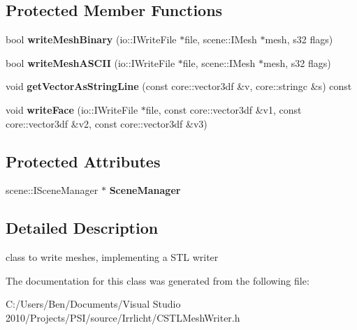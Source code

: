 \subsection*{Protected Member Functions}
\begin{DoxyCompactItemize}
\item 
\hypertarget{classirr_1_1scene_1_1_c_s_t_l_mesh_writer_a7c342c2b76a3b5ddefe7aeeedb5c644d}{bool {\bfseries write\-Mesh\-Binary} (io\-::\-I\-Write\-File $\ast$file, scene\-::\-I\-Mesh $\ast$mesh, s32 flags)}\label{classirr_1_1scene_1_1_c_s_t_l_mesh_writer_a7c342c2b76a3b5ddefe7aeeedb5c644d}

\item 
\hypertarget{classirr_1_1scene_1_1_c_s_t_l_mesh_writer_a773fa656db06bf3668f823cabb79c4df}{bool {\bfseries write\-Mesh\-A\-S\-C\-I\-I} (io\-::\-I\-Write\-File $\ast$file, scene\-::\-I\-Mesh $\ast$mesh, s32 flags)}\label{classirr_1_1scene_1_1_c_s_t_l_mesh_writer_a773fa656db06bf3668f823cabb79c4df}

\item 
\hypertarget{classirr_1_1scene_1_1_c_s_t_l_mesh_writer_a4d89343c498113f9b45ca1c4e176fd55}{void {\bfseries get\-Vector\-As\-String\-Line} (const core\-::vector3df \&v, core\-::stringc \&s) const }\label{classirr_1_1scene_1_1_c_s_t_l_mesh_writer_a4d89343c498113f9b45ca1c4e176fd55}

\item 
\hypertarget{classirr_1_1scene_1_1_c_s_t_l_mesh_writer_a5cd2114128f78516e3d786822dff75cc}{void {\bfseries write\-Face} (io\-::\-I\-Write\-File $\ast$file, const core\-::vector3df \&v1, const core\-::vector3df \&v2, const core\-::vector3df \&v3)}\label{classirr_1_1scene_1_1_c_s_t_l_mesh_writer_a5cd2114128f78516e3d786822dff75cc}

\end{DoxyCompactItemize}
\subsection*{Protected Attributes}
\begin{DoxyCompactItemize}
\item 
\hypertarget{classirr_1_1scene_1_1_c_s_t_l_mesh_writer_a30763edf30a3b37b49d044fbf1982dfe}{scene\-::\-I\-Scene\-Manager $\ast$ {\bfseries Scene\-Manager}}\label{classirr_1_1scene_1_1_c_s_t_l_mesh_writer_a30763edf30a3b37b49d044fbf1982dfe}

\end{DoxyCompactItemize}


\subsection{Detailed Description}
class to write meshes, implementing a S\-T\-L writer 

The documentation for this class was generated from the following file\-:\begin{DoxyCompactItemize}
\item 
C\-:/\-Users/\-Ben/\-Documents/\-Visual Studio 2010/\-Projects/\-P\-S\-I/source/\-Irrlicht/C\-S\-T\-L\-Mesh\-Writer.\-h\end{DoxyCompactItemize}
